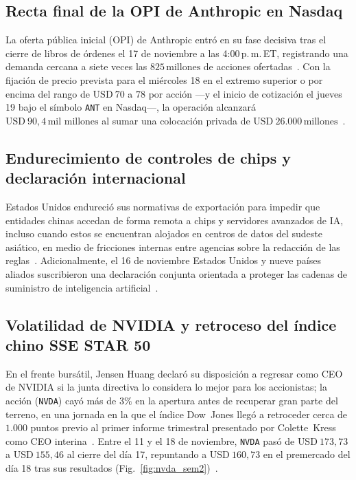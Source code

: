 \documentclass[conference,twocolumn,spanish]{IEEEtran}
\begin{document}
\subsection{Recta final de la OPI de Anthropic en Nasdaq}
La oferta pública inicial (OPI) de Anthropic entró en su fase decisiva tras el cierre de libros de órdenes el 17 de noviembre a las 4:00\,p.\,m.\,ET, registrando una demanda cercana a siete veces las $825\,\text{millones}$ de acciones ofertadas~\cite{bloomberg_anthropic_ipo_2026,yahoo_anthropic_ipo_2026}. Con la fijación de precio prevista para el miércoles 18 en el extremo superior o por encima del rango de $\text{USD}~70$ a $78$ por acción ---y el inicio de cotización el jueves 19 bajo el símbolo \texttt{ANT} en Nasdaq---, la operación alcanzará $\text{USD}~90{,}4\,\text{mil millones}$ al sumar una colocación privada de $\text{USD}~26.000\,\text{millones}$~\cite{bloomberg_anthropic_ipo_2026}.

\subsection{Endurecimiento de controles de chips y declaración internacional}
Estados Unidos endureció sus normativas de exportación para impedir que entidades chinas accedan de forma remota a chips y servidores avanzados de IA, incluso cuando estos se encuentran alojados en centros de datos del sudeste asiático, en medio de fricciones internas entre agencias sobre la redacción de las reglas~\cite{scmp_chip_controls_2026,winterm_chip_controls_2026}. Adicionalmente, el 16 de noviembre Estados Unidos y nueve países aliados suscribieron una declaración conjunta orientada a proteger las cadenas de suministro de inteligencia artificial~\cite{scmp_chip_controls_2026}.

\subsection{Volatilidad de NVIDIA y retroceso del índice chino SSE STAR 50}
En el frente bursátil, Jensen Huang declaró su disposición a regresar como CEO de NVIDIA si la junta directiva lo considera lo mejor para los accionistas; la acción (\texttt{NVDA}) cayó más de $3\%$ en la apertura antes de recuperar gran parte del terreno, en una jornada en la que el índice Dow~Jones llegó a retroceder cerca de $1.000$ puntos previo al primer informe trimestral presentado por Colette~Kress como CEO interina~\cite{yahoo_nvidia_kress_2026,cnbc_market_nov16_2026}. Entre el 11 y el 18 de noviembre, \texttt{NVDA} pasó de $\text{USD}~173{,}73$ a $\text{USD}~155{,}46$ al cierre del día 17, repuntando a $\text{USD}~160{,}73$ en el premercado del día 18 tras sus resultados (Fig.~\ref{fig:nvda_sem2})~\cite{investing_nvda_sem2_2026}.
\end{document}
